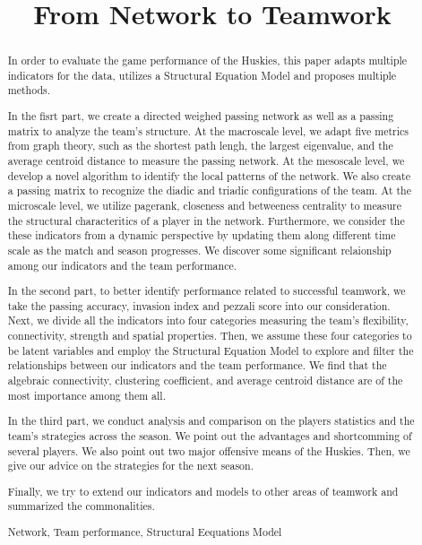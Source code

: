 \documentclass{mcmthesis}
\begin{document}
\title{From Network to Teamwork}
\begin{abstract}

In order to evaluate the game performance of the Huskies, this paper adapts multiple indicators for the data, utilizes a Structural Equation Model and proposes multiple methods.

In the fisrt part, we create a directed weighed passing network as well as a passing matrix to analyze the team's structure. At the macroscale level, we adapt five metrics from graph theory, such as the shortest path lengh, the largest eigenvalue, and the average centroid distance to measure the passing network. At the mesoscale level, we develop a novel algorithm to identify the local patterns of the network. We also create a passing matrix to recognize the diadic and triadic configurations of the team. At the microscale level, we utilize pagerank, closeness and betweeness centrality to measure the structural characteritics of a player in the network. Furthermore, we consider the these indicators from a dynamic perspective by updating them along different time scale as the match and season progresses. We discover some significant relaionship among our indicators and the team performance. 

In the second part, to better identify performance related to successful teamwork, we take the passing accuracy, invasion index and pezzali score into our consideration. Next, we divide all the indicators into four categories measuring the team's flexibility, connectivity, strength and spatial properties. Then, we assume these four categories to be latent variables and employ the Structural Equation Model to explore and filter the relationships between our indicators and the team performance. We find that the algebraic connectivity, clustering coefficient, and average centroid distance are of the most importance among them all.

In the third part, we conduct analysis and comparison on the players statistics and the team's strategies across the season. We point out the advantages and shortcomming of several players. We also point out two major offensive means of the Huskies. Then, we give our advice on the strategies for the next season.

Finally, we try to extend our indicators and models to other areas of teamwork and summarized the commonalities.
\begin{keywords}
Network, Team performance, Structural Eequations Model
\end{keywords}
\end{abstract}
\maketitle
\tableofcontents
\end{document}
